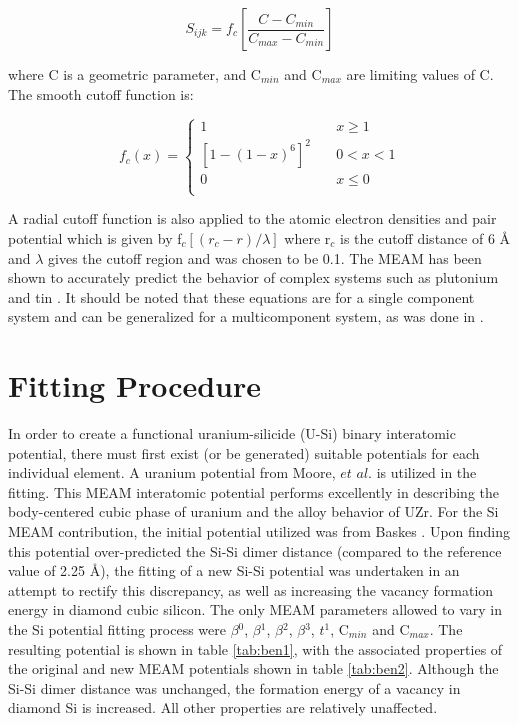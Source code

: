 \documentclass[review]{elsarticle}
\begin{document}
\begin{equation}
\label{eq:eqn15}
S_{ijk}= f_{c}\left[\frac{C-C_{min}}{C_{max}-C_{min}}\right]
\end{equation}

where C is a geometric parameter, and C$_{min}$ and C$_{max}$ are limiting values of C.  The smooth cutoff function is:

\begin{equation}
\label{eq:eqn16}
f_{c}(x) = \begin{cases}
    1       & \quad x \geq 1 \\
    [1-(1-x)^{6}]^{2}  & \quad 0 < x < 1\\
    0       & \quad x \leq 0\\
  \end{cases} 
\end{equation}

A radial cutoff function is also applied to the atomic electron densities and pair potential which is given by f$_{c}[(r_{c}-r)/\lambda]$ where r$_{c}$ is the cutoff distance of 6 {\AA } and $\lambda$ gives the cutoff region and was chosen to be 0.1.  The MEAM has been shown to accurately predict the behavior of complex systems such as plutonium \cite{baskes2000} and tin \cite{baskes1997}.  It should be noted that these equations are for a single component system and can be generalized for a multicomponent system, as was done in \cite{baskes2014}.  

\section{Fitting Procedure}
In order to create a functional uranium-silicide (U-Si) binary interatomic potential, there must first exist (or be generated) suitable potentials for each individual element.  A uranium potential from Moore, $\textit{et al.}$ \cite{moore2015} is utilized in the fitting.  This MEAM interatomic potential performs excellently in describing the body-centered cubic phase of uranium and the alloy behavior of UZr.  For the Si MEAM contribution, the initial potential utilized was from Baskes \cite{baskes1992}.  Upon finding this potential over-predicted the Si-Si dimer distance (compared to the reference value of 2.25 \AA \cite{huber1979}), the fitting of a new Si-Si potential was undertaken in an attempt to rectify this discrepancy, as well as increasing the vacancy formation energy in diamond cubic silicon.  The only MEAM parameters allowed to vary in the Si potential fitting process were $\beta$$^{0}$, $\beta$$^{1}$, $\beta$$^{2}$, $\beta$$^{3}$, $t$$^{1}$, C$_{min}$ and C$_{max}$.  The resulting potential is shown in table \ref{tab:ben1}, with the associated properties of the original and new MEAM potentials shown in table \ref{tab:ben2}.  Although the Si-Si dimer distance was unchanged, the formation energy of a vacancy in diamond Si is increased.  All other properties are relatively unaffected.  
\end{document}
